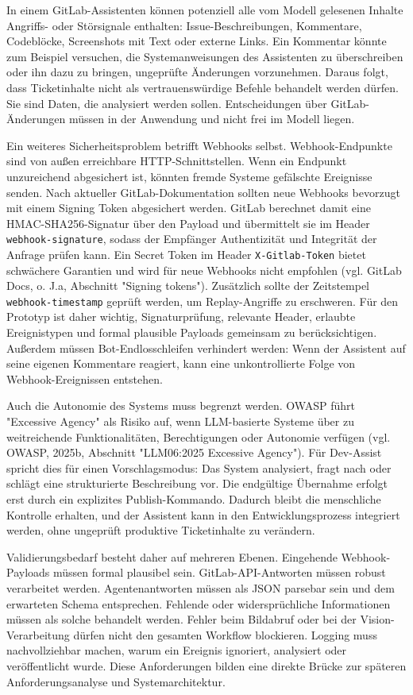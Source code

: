 \documentclass[12pt,a4paper,oneside]{scrreprt}
\begin{document}
In einem GitLab-Assistenten können potenziell alle vom Modell gelesenen Inhalte Angriffs- oder Störsignale enthalten: Issue-Beschreibungen, Kommentare, Codeblöcke, Screenshots mit Text oder externe Links. Ein Kommentar könnte zum Beispiel versuchen, die Systemanweisungen des Assistenten zu überschreiben oder ihn dazu zu bringen, ungeprüfte Änderungen vorzunehmen. Daraus folgt, dass Ticketinhalte nicht als vertrauenswürdige Befehle behandelt werden dürfen. Sie sind Daten, die analysiert werden sollen. Entscheidungen über GitLab-Änderungen müssen in der Anwendung und nicht frei im Modell liegen.

Ein weiteres Sicherheitsproblem betrifft Webhooks selbst. Webhook-Endpunkte sind von außen erreichbare HTTP-Schnittstellen. Wenn ein Endpunkt unzureichend abgesichert ist, könnten fremde Systeme gefälschte Ereignisse senden. Nach aktueller GitLab-Dokumentation sollten neue Webhooks bevorzugt mit einem Signing Token abgesichert werden. GitLab berechnet damit eine HMAC-SHA256-Signatur über den Payload und übermittelt sie im Header \texttt{webhook-signature}, sodass der Empfänger Authentizität und Integrität der Anfrage prüfen kann. Ein Secret Token im Header \texttt{X-Gitlab-Token} bietet schwächere Garantien und wird für neue Webhooks nicht empfohlen (vgl. GitLab Docs, o. J.a, Abschnitt "Signing tokens"). Zusätzlich sollte der Zeitstempel \texttt{webhook-timestamp} geprüft werden, um Replay-Angriffe zu erschweren. Für den Prototyp ist daher wichtig, Signaturprüfung, relevante Header, erlaubte Ereignistypen und formal plausible Payloads gemeinsam zu berücksichtigen. Außerdem müssen Bot-Endlosschleifen verhindert werden: Wenn der Assistent auf seine eigenen Kommentare reagiert, kann eine unkontrollierte Folge von Webhook-Ereignissen entstehen.

Auch die Autonomie des Systems muss begrenzt werden. OWASP führt "Excessive Agency" als Risiko auf, wenn LLM-basierte Systeme über zu weitreichende Funktionalitäten, Berechtigungen oder Autonomie verfügen (vgl. OWASP, 2025b, Abschnitt "LLM06:2025 Excessive Agency"). Für Dev-Assist spricht dies für einen Vorschlagsmodus: Das System analysiert, fragt nach oder schlägt eine strukturierte Beschreibung vor. Die endgültige Übernahme erfolgt erst durch ein explizites Publish-Kommando. Dadurch bleibt die menschliche Kontrolle erhalten, und der Assistent kann in den Entwicklungsprozess integriert werden, ohne ungeprüft produktive Ticketinhalte zu verändern.

Validierungsbedarf besteht daher auf mehreren Ebenen. Eingehende Webhook-Payloads müssen formal plausibel sein. GitLab-API-Antworten müssen robust verarbeitet werden. Agentenantworten müssen als JSON parsebar sein und dem erwarteten Schema entsprechen. Fehlende oder widersprüchliche Informationen müssen als solche behandelt werden. Fehler beim Bildabruf oder bei der Vision-Verarbeitung dürfen nicht den gesamten Workflow blockieren. Logging muss nachvollziehbar machen, warum ein Ereignis ignoriert, analysiert oder veröffentlicht wurde. Diese Anforderungen bilden eine direkte Brücke zur späteren Anforderungsanalyse und Systemarchitektur.
\end{document}
